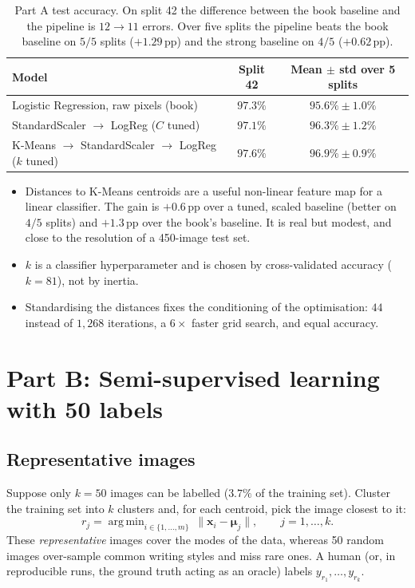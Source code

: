 \documentclass[11pt,a4paper]{article}
\newcommand{\x}{\mathbf{x}}
\newcommand{\vmu}{\boldsymbol{\mu}}
\DeclareMathOperator*{\argmin}{arg\,min}
\begin{document}
\begin{table}[h]
  \centering
  \begin{tabular}{lcc}
    \toprule
    Model & Split 42 & Mean $\pm$ std over 5 splits \\
    \midrule
    Logistic Regression, raw pixels (book) & $97.3\%$ & $95.6\% \pm 1.0\%$ \\
    StandardScaler $\to$ LogReg ($C$ tuned) & $97.1\%$ & $96.3\% \pm 1.2\%$ \\
    K-Means $\to$ StandardScaler $\to$ LogReg ($k$ tuned) & $\mathbf{97.6\%}$ & $\mathbf{96.9\% \pm 0.9\%}$ \\
    \bottomrule
  \end{tabular}
  \caption{Part A test accuracy. On split 42 the difference between the book baseline and the pipeline is
  $12\to11$ errors. Over five splits the pipeline beats the book baseline on $5/5$ splits ($+1.29$\,pp) and the
  strong baseline on $4/5$ ($+0.62$\,pp).}
\end{table}

\begin{summarybox}
\begin{itemize}[leftmargin=1.2em]
  \item Distances to K-Means centroids are a useful non-linear feature map for a linear classifier. The gain is
        $+0.6$\,pp over a tuned, scaled baseline (better on $4/5$ splits) and $+1.3$\,pp over the book's baseline.
        It is real but modest, and close to the resolution of a 450-image test set.
  \item $k$ is a classifier hyperparameter and is chosen by cross-validated accuracy ($k=81$), not by inertia.
  \item Standardising the distances fixes the conditioning of the optimisation: $44$ instead of $1{,}268$
        iterations, a $6\times$ faster grid search, and equal accuracy.
\end{itemize}
\end{summarybox}

\section{Part B: Semi-supervised learning with 50 labels}

\subsection{Representative images}
Suppose only $k=50$ images can be labelled ($3.7\%$ of the training set). Cluster the training set into $k$
clusters and, for each centroid, pick the image closest to it:
\begin{equation}
  r_j=\argmin_{i\in\{1,\dots,m\}}\ \lVert\x_i-\vmu_j\rVert,\qquad j=1,\dots,k.
\end{equation}
These \emph{representative} images cover the modes of the data, whereas 50 random images over-sample common
writing styles and miss rare ones. A human (or, in reproducible runs, the ground truth acting as an oracle) labels
$y_{r_1},\dots,y_{r_k}$.
\end{document}
